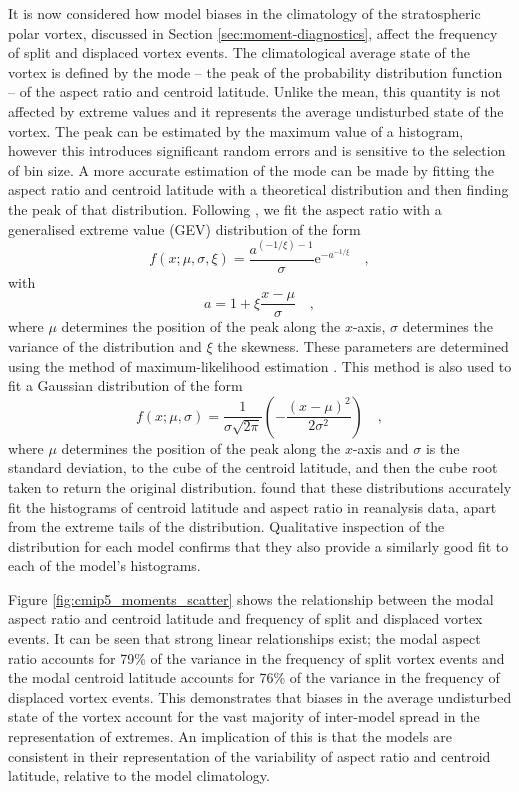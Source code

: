 \bigskip It is now considered how model biases in the climatology of the
stratospheric polar vortex, discussed in Section \ref{sec:moment-diagnostics},
affect the frequency of split and displaced vortex events. The climatological
average state of the vortex is defined by the mode -- the peak of the
probability distribution function -- of the aspect ratio and centroid
latitude. Unlike the mean, this quantity is not affected by extreme values and
it represents the average undisturbed state of the vortex. The peak can be
estimated by the maximum value of a histogram, however this introduces
significant random errors and is sensitive to the selection of bin size. A more
accurate estimation of the mode can be made by fitting the aspect ratio and
centroid latitude with a theoretical distribution and then finding the peak of
that distribution. Following \citet{Mitchell2011}, we fit the aspect ratio with
a generalised extreme value (GEV) distribution of the form
\begin{equation}
f(x;\mu,\sigma,\xi) = \frac{a^{(-1/\xi)-1}}{\sigma}\mathrm{e}^{{-a}^{-1/\xi}}
\quad , 
\end{equation}
with
\begin{equation} 
a = 1 + \xi \frac{x-\mu}{\sigma} \quad ,
\end{equation}
where $\mu$ determines the position of the peak along the $x$-axis, $\sigma$
determines the variance of the distribution and $\xi$ the skewness. These
parameters are determined using the method of maximum-likelihood estimation
\citep{Wilks}. This method is also used to fit a Gaussian distribution of the
form
\begin{equation}
f(x;\mu,\sigma) = \frac{1}{\sigma\sqrt{2\pi}} \left(
  -\frac{(x-\mu)^2}{2\sigma^{2}} \right) \quad ,
\end{equation}
where $\mu$ determines the position of the peak along the $x$-axis and $\sigma$
is the standard deviation, to the cube of the centroid latitude, and then the
cube root taken to return the original distribution. \citet{Mitchell2011} found
that these distributions accurately fit the histograms of centroid latitude and
aspect ratio in reanalysis data, apart from the extreme tails of the
distribution. Qualitative inspection of the distribution for each model confirms
that they also provide a similarly good fit to each of the model's histograms.

Figure \ref{fig:cmip5_moments_scatter} shows the relationship between the modal
aspect ratio and centroid latitude and frequency of split and displaced vortex
events. It can be seen that strong linear relationships exist; the modal aspect
ratio accounts for 79\% of the variance in the frequency of split vortex events
and the modal centroid latitude accounts for 76\% of the variance in the
frequency of displaced vortex events. This demonstrates that biases in the
average undisturbed state of the vortex account for the vast majority of
inter-model spread in the representation of extremes. An implication of this is
that the models are consistent in their representation of the variability of
aspect ratio and centroid latitude, relative to the model climatology.

